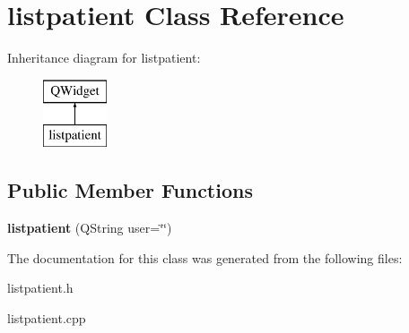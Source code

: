 \hypertarget{classlistpatient}{}\section{listpatient Class Reference}
\label{classlistpatient}
Inheritance diagram for listpatient\+:\begin{figure}[H]
\begin{center}
\leavevmode
\includegraphics[height=2.000000cm]{classlistpatient}
\end{center}
\end{figure}
\subsection*{Public Member Functions}
\begin{DoxyCompactItemize}
\item 
\mbox{\label{classlistpatient_addf49db675647f4a2e5b6b50e79cf879}} 
{\bfseries listpatient} (Q\+String user=\char`\"{}\char`\"{})
\end{DoxyCompactItemize}


The documentation for this class was generated from the following files\+:\begin{DoxyCompactItemize}
\item 
listpatient.\+h\item 
listpatient.\+cpp\end{DoxyCompactItemize}
